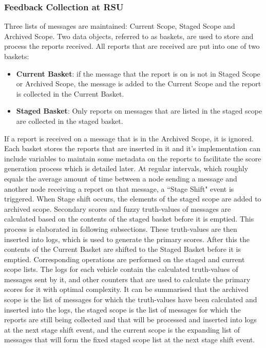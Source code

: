 \documentclass[journal]{IEEEtran}
\begin{document}
\subsubsection{Feedback Collection at RSU}
Three lists of messages are maintained: Current Scope, Staged Scope and Archived Scope.
Two data objects, referred to as baskets, are used to store and process the reports received. All reports that are received are put into one of two baskets:
\begin{itemize}
	\item \textbf{Current Basket}: if the message that the report is on is not in Staged Scope or Archived Scope, the message is added to the Current Scope and the report is collected in the Current Basket.
	\item \textbf{Staged Basket}: Only reports on messages that are listed in the staged scope are collected in the staged basket.
\end{itemize}
If a report is received on a message that is in the Archived Scope, it is ignored. Each basket stores the reports that are inserted in it and it's implementation can include variables to maintain some metadata on the reports to facilitate the score generation process which is detailed later. At regular intervals, which roughly equals the average amount of time between a node sending a message and another node receiving a report on that message, a ``Stage Shift" event is triggered. When Stage shift occurs, the elements of the staged scope are added to archived scope. Secondary scores and fuzzy truth-values of messages are calculated based on the contents of the staged basket before it is emptied. This process is elaborated in following subsections. These truth-values are then inserted into logs, which is used to generate the primary scores. After this the contents of the Current Basket are shifted to the Staged Basket before it is emptied. Corresponding operations are performed on the staged and current scope lists. 
The logs for each vehicle contain the calculated truth-values of messages sent by it, and other counters that are used to calculate the primary scores for it with optimal complexity.
It can be summarised that the archived scope is the list of messages for which the truth-values have been calculated and inserted into the logs, the staged scope is the list of messages for which the reports are still being collected and that will be processed and inserted into logs at the next stage shift event, and the current scope is the expanding list of messages that will form the fixed staged scope list at the next stage shift event.
\end{document}
